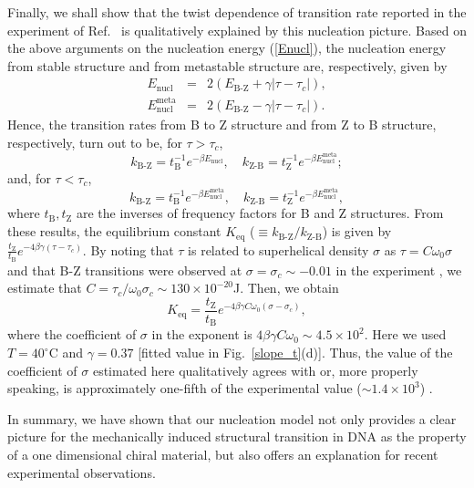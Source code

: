 \documentclass[pre,showpacs,twocolumn,superscriptaddress]{revtex4}
\begin{document}
Finally,
we shall show 
that
the twist dependence of transition rate reported in the experiment of Ref.~\cite{BZtrans}
is qualitatively explained by this nucleation picture.
Based on the above arguments on the nucleation energy (\ref{Enucl}),
the nucleation energy from stable structure
and from metastable structure are, respectively, given by
\begin{eqnarray*}
E_\text{nucl}&=&2(E_{\text{B-Z}}+\gamma |\tau-\tau_c|),\\
E^\text{meta}_\text{nucl}&=&2(E_{\text{B-Z}}-\gamma |\tau-\tau_c|).
\end{eqnarray*} 
Hence,
the transition rates from B to Z structure and from Z to B structure, 
respectively,
turn out to be, for $\tau>\tau_c$,
\begin{equation}k_{\text{B-Z}}=t_\text{B}^{-1} e^{-\beta E_\text{nucl}},\quad
k_{\text{Z-B}}=t_\text{Z}^{-1} e^{-\beta E^\text{meta}_\text{nucl}};
\end{equation}
and, for  $\tau<\tau_c$,
\begin{equation}k_{\text{B-Z}}=t_\text{B}^{-1} e^{-\beta E^\text{meta}_\text{nucl}},\quad
k_{\text{Z-B}}=t_\text{Z}^{-1} e^{-\beta E^\text{meta}_\text{nucl}},
\end{equation}
where
$t_\text{B}, t_\text{Z}$ are the inverses of frequency factors for B and Z structures.
From these results,
the equilibrium constant $K_\text{eq}$ ($\equiv k_{\text{B-Z}}/k_{\text{Z-B}}$)
is given by
$\frac{t_\text{Z}}{t_\text{B}}e^{-4 \beta \gamma (\tau-\tau_c )}$.
By noting that
$\tau$ is related to superhelical density $\sigma$ as
$\tau=C \omega_0 \sigma$ \cite{endnote2}
and that
B-Z transitions were observed at $\sigma=\sigma_c\sim-0.01$
in the experiment \cite{BZtrans},
we estimate that
$C=\tau_c/\omega_0\sigma_c \sim 130\times 10^{-20}$J.
Then, we obtain
\begin{equation}
K_\text{eq}=\frac{t_\text{Z}}{t_\text{B}}e^{-4 \beta \gamma C \omega_0
 (\sigma-\sigma_c)},
\end{equation}
where 
the coefficient of $\sigma$ in the exponent
is $4 \beta \gamma C \omega_0 \sim 4.5\times 10^2$.
Here we used 
$T= 40^\circ$C and $\gamma=0.37$ [fitted value in Fig.~\ref{slope_t}(d)].
Thus,
the value of the coefficient of $\sigma$ estimated here
qualitatively agrees with
or, more properly speaking,
 is approximately one-fifth of 
the experimental value ($\sim 1.4\times10^3$)
\cite{endnote3}.

In summary,
we have shown
that our nucleation model not only provides 
a clear picture 
for the mechanically induced structural transition in DNA as
the property of a
one dimensional chiral material,
but also offers an explanation for recent experimental observations.
\end{document}

